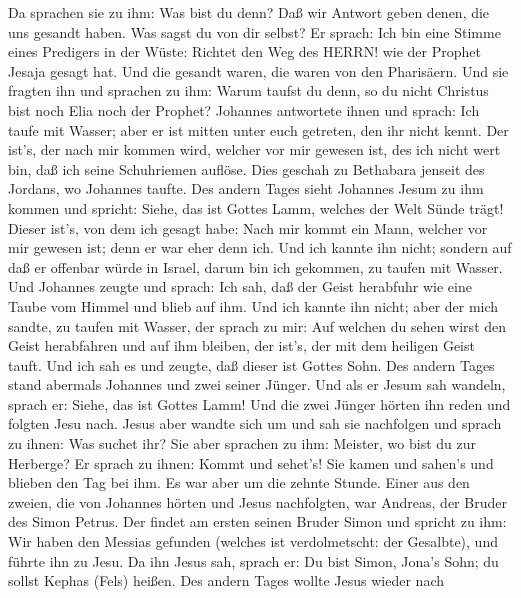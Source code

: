  Da sprachen sie zu ihm: Was bist du denn? Daß wir Antwort
geben denen, die uns gesandt haben. Was sagst du von dir selbst?
 Er sprach: Ich bin eine Stimme eines Predigers in der
Wüste: Richtet den Weg des HERRN! wie der Prophet Jesaja gesagt hat.
 Und die gesandt waren, die waren von den Pharisäern.
 Und sie fragten ihn und sprachen zu ihm: Warum taufst du
denn, so du nicht Christus bist noch Elia noch der Prophet?
 Johannes antwortete ihnen und sprach: Ich taufe mit
Wasser; aber er ist mitten unter euch getreten, den ihr nicht kennt.
 Der ist's, der nach mir kommen wird, welcher vor mir
gewesen ist, des ich nicht wert bin, daß ich seine Schuhriemen auflöse.
 Dies geschah zu Bethabara jenseit des Jordans, wo Johannes
taufte.  Des andern Tages sieht Johannes Jesum zu ihm
kommen und spricht: Siehe, das ist Gottes Lamm, welches der Welt Sünde
trägt!  Dieser ist's, von dem ich gesagt habe: Nach mir
kommt ein Mann, welcher vor mir gewesen ist; denn er war eher denn ich.
 Und ich kannte ihn nicht; sondern auf daß er offenbar
würde in Israel, darum bin ich gekommen, zu taufen mit Wasser.
 Und Johannes zeugte und sprach: Ich sah, daß der Geist
herabfuhr wie eine Taube vom Himmel und blieb auf ihm.  Und
ich kannte ihn nicht; aber der mich sandte, zu taufen mit Wasser, der
sprach zu mir: Auf welchen du sehen wirst den Geist herabfahren und auf
ihm bleiben, der ist's, der mit dem heiligen Geist tauft. 
Und ich sah es und zeugte, daß dieser ist Gottes Sohn.  Des
andern Tages stand abermals Johannes und zwei seiner Jünger.
 Und als er Jesum sah wandeln, sprach er: Siehe, das ist
Gottes Lamm!  Und die zwei Jünger hörten ihn reden und
folgten Jesu nach.  Jesus aber wandte sich um und sah sie
nachfolgen und sprach zu ihnen: Was suchet ihr? Sie aber sprachen zu
ihm: Meister, wo bist du zur Herberge?  Er sprach zu ihnen:
Kommt und sehet's! Sie kamen und sahen's und blieben den Tag bei ihm. Es
war aber um die zehnte Stunde.  Einer aus den zweien, die
von Johannes hörten und Jesus nachfolgten, war Andreas, der Bruder des
Simon Petrus.  Der findet am ersten seinen Bruder Simon und
spricht zu ihm: Wir haben den Messias gefunden (welches ist
verdolmetscht: der Gesalbte),  und führte ihn zu Jesu. Da
ihn Jesus sah, sprach er: Du bist Simon, Jona's Sohn; du sollst Kephas
(Fels) heißen.  Des andern Tages wollte Jesus wieder nach
